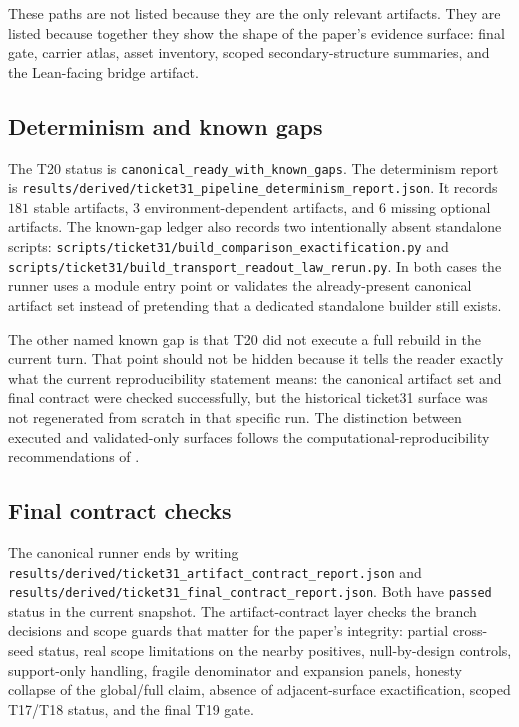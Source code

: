 \documentclass[11pt]{article}
\theoremstyle{definition}
\begin{document}
These paths are not listed because they are the only relevant artifacts. They are listed
because together they show the shape of the paper's evidence surface: final gate,
carrier atlas, asset inventory, scoped secondary-structure summaries, and the Lean-facing
bridge artifact.

\subsection{Determinism and known gaps}

The T20 status is \nolinkurl{canonical_ready_with_known_gaps}. The determinism report is
\nolinkurl{results/derived/ticket31_pipeline_determinism_report.json}. It records
\(181\) stable artifacts, \(3\) environment-dependent artifacts, and \(6\) missing optional
artifacts. The known-gap ledger also records two intentionally absent standalone scripts:
\nolinkurl{scripts/ticket31/build_comparison_exactification.py} and
\nolinkurl{scripts/ticket31/build_transport_readout_law_rerun.py}. In both cases the
runner uses a module entry point or validates the already-present canonical artifact set
instead of pretending that a dedicated standalone builder still exists.

The other named known gap is that T20 did not execute a full rebuild in the current turn.
That point should not be hidden because it tells the reader exactly what the current
reproducibility statement means: the canonical artifact set and final contract were checked
successfully, but the historical ticket31 surface was not regenerated from scratch in that
specific run. The distinction between executed and validated-only surfaces follows the
computational-reproducibility recommendations of \citet{StoddenEtAl2016}.

\subsection{Final contract checks}

The canonical runner ends by writing
\nolinkurl{results/derived/ticket31_artifact_contract_report.json} and
\nolinkurl{results/derived/ticket31_final_contract_report.json}. Both have
\texttt{passed} status in the current snapshot. The artifact-contract layer checks the
branch decisions and scope guards that matter for the paper's integrity: partial
cross-seed status, real scope limitations on the nearby positives, null-by-design controls,
support-only handling, fragile denominator and expansion panels, honesty collapse of the
global/full claim, absence of adjacent-surface exactification, scoped T17/T18 status, and
the final T19 gate.
\end{document}
